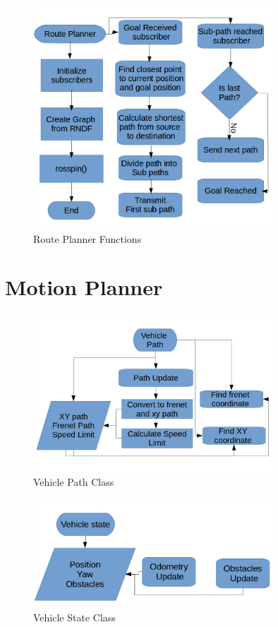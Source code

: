 \begin{figure}
	\centering
	\includegraphics[width=0.8\textwidth]{Images/implementation/route_planner.png}
	\caption{Route Planner Functions}
	\label{route_planner_func}
\end{figure}

\section{Motion Planner}

\begin{figure}
	\centering
	\includegraphics[width=0.8\textwidth]{Images/implementation/vehicle_path.png}
	\caption{Vehicle Path Class}
	\label{vehicle_path_class}
\end{figure}

\begin{figure}
	\centering
	\includegraphics[width=0.8\textwidth]{Images/implementation/vehicle_state.png}
	\caption{Vehicle State Class}
	\label{vehicle_state_class}
\end{figure}

